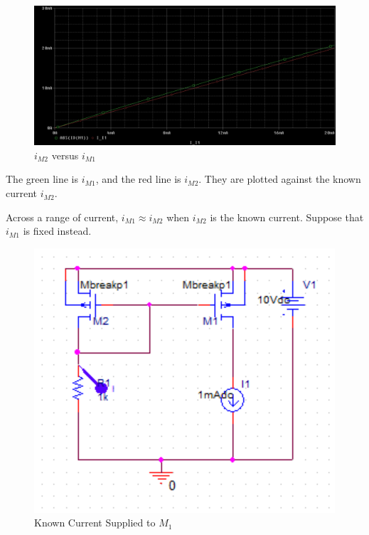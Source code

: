 \FloatBarrier

\FloatBarrier

\begin{figure}[h!]
	\centering
	\includegraphics[scale=0.50]{../images/plot_1.PNG}
	\caption{$i_{M2}$ versus $i_{M1}$}
	\label{fig:plot_1}
\end{figure}

\FloatBarrier

{\footnotesize The green line is $i_{M1}$, and the red line is $i_{M2}$. They are plotted against the known current $i_{M2}$.}

\FloatBarrier

Across a range of current, $i_{M1} \approx i_{M2}$ when $i_{M2}$ is the known current.
Suppose that $i_{M1}$ is fixed instead.

\FloatBarrier

\begin{figure}[h!]
	\centering
	\includegraphics[scale=0.75]{../images/thought_exp2.PNG}
	\caption{Known Current Supplied to $M_1$}
	\label{fig:thought_exp2}
\end{figure}

